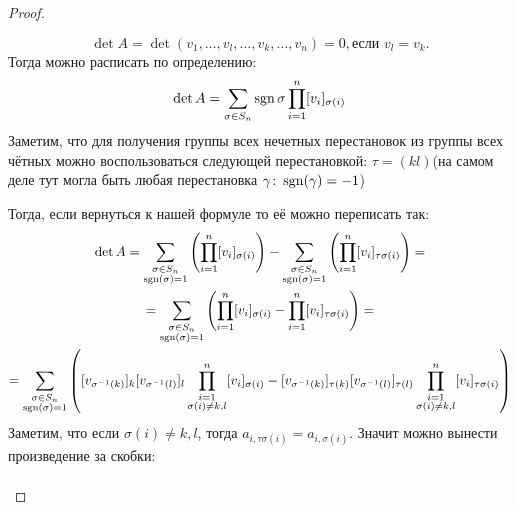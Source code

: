 \begin{proof}
\begin{enumerate}
\begin{itemize}
                    \[
                    \det A = \det(v_1,\dots, v_l,\dots, v_k,\dots, v_n) = 0, \text{если } v_l = v_k.
                    \]
                    Тогда можно расписать по определению:
                    \[
                        \det A = \sum\limits_{\sigma\in S_n}^{}{\operatorname{sgn}\sigma\prod\limits_{i=1}^{n}[v_i]_{\sigma(i)}}
                    \]
                    Заметим, что для получения группы всех нечетных перестановок из группы всех 
                    чётных можно воспользоваться следующей перестановкой: $\tau=(kl)$(на самом
                    деле тут могла быть любая перестановка $\gamma\colon \operatorname{sgn}(\gamma) = -1$)

                    Тогда, если вернуться к нашей формуле то её можно переписать так:
                    \[
                    \begin{gathered}
                        \det A = 
                        \sum\limits_{\substack{\sigma\in S_n\\\operatorname{sgn}(\sigma)=1}}
                        \left(\prod\limits_{i=1}^{n}[v_i]_{\sigma(i)}\right)
                            - 
                        \sum\limits_{\substack{\sigma\in S_n\\\operatorname{sgn}(\sigma)=1}}
                        \left(\prod\limits_{i=1}^{n}[v_i]_{\tau\sigma(i)}\right) =
                        \\
                        = 
                        \sum\limits_{\substack{\sigma\in S_n\\\operatorname{sgn}(\sigma)=1}}
                        \left(\prod\limits_{i=1}^{n}[v_i]_{\sigma(i)}- \prod\limits_{i=1}^{n}[v_i]_{\tau\sigma(i)}\right) =
                        \\
                        = 
                        \sum\limits_{\substack{\sigma\in S_n\\\operatorname{sgn}(\sigma)=1}}
                        \left([v_{\sigma^{-1}(k)}]_k [v_{\sigma^{-1}(l)}]_l \prod\limits_{\substack{i=1\\\sigma(i)\not=k,l}}^{n}[v_i]_{\sigma(i)}-
                        [v_{\sigma^{-1}(k)}]_{\tau(k)} [v_{\sigma^{-1}(l)}]_{\tau(l)} \prod\limits_{\substack{i=1\\\sigma(i)\not=k,l}}^{n}[v_i]_{\tau\sigma(i)}\right)
                    \end{gathered}
                    \]
                    Заметим, что если $\sigma(i)\not= k,l$, тогда $a_{i, \tau\sigma(i)} = a_{i,\sigma(i)}$.
                    Значит можно вынести произведение за скобки:
                    \[
                    \begin{gathered}

\end{gathered}\]
\end{itemize}
\end{enumerate}
\end{proof}
